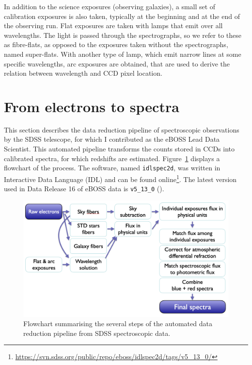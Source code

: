 In addition to the science exposures (observing galaxies), a small set
of calibration exposures is also taken, typically at the beginning and at the end 
of the observing run. Flat exposures are taken with lamps that emit over all 
wavelengths. The light is passed through the spectrographs, so we refer to these
as fibre-flats, as opposed to the exposures taken without the spectrographs, named 
super-flats. With another type of lamp, which emit narrow lines at some specific 
wavelengths, arc exposures are obtained, that are used to derive the relation between 
wavelength and CCD pixel location.

\section{From electrons to spectra}
\label{spectro:pipeline2d}

This section describes the data reduction pipeline of 
spectroscopic observations by the SDSS telescope, for which 
I contributed as the eBOSS Lead Data Scientist. 
This automated pipeline transforms the counts stored in CCDs into 
calibrated spectra, for which redshifts are estimated. 
Figure~\ref{fig:pipeline} displays a flowchart of the process. 
The software, named \texttt{idlspec2d}, was written in Interactive Data Language (IDL)
and can be found online\footnote{\url{https://svn.sdss.org/public/repo/eboss/idlspec2d/tags/v5_13_0/}}.
The latest version used in Data Release 16 
of eBOSS data is \texttt{v5\_13\_0} (\cite{ahumada16thDataRelease2020}).


\begin{figure}
    \centering 
    \includegraphics[width=\textwidth]{fig/spectro/pipeline_flowchart.png}
    \caption{Flowchart summarising the several steps of the automated data reduction pipeline from SDSS spectroscopic data.}
    \label{fig:pipeline}
\end{figure}
 

